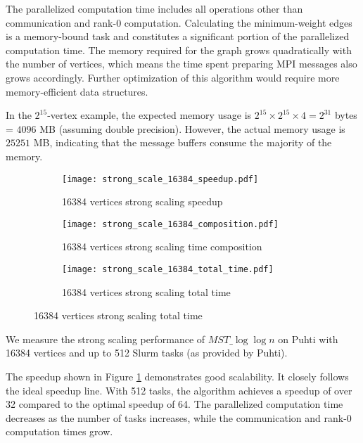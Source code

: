 \documentclass[english, 12pt, a4paper, elec, utf8, a-2b, online]{aaltothesis}
\newcommand{\mstalgo}{$MST\_\log\log{n}$}
\begin{document}
The parallelized computation time includes all operations other than communication and rank-0 computation. Calculating the minimum-weight edges is a memory-bound task and constitutes a significant portion of the parallelized computation time. The memory required for the graph grows quadratically with the number of vertices, which means the time spent preparing MPI messages also grows accordingly. Further optimization of this algorithm would require more memory-efficient data structures.

In the $2^{15}$-vertex example, the expected memory usage is $2^{15} \times 2^{15} \times 4 = 2^{31}$ bytes = $4096$ MB (assuming double precision). However, the actual memory usage is $25251$ MB, indicating that the message buffers consume the majority of the memory.

\begin{figure}[h]
	\begin{subfigure}[b]{0.45\textwidth}
		\centering
		\texttt{[image: strong\_scale\_16384\_speedup.pdf]}
		\caption{16384 vertices strong scaling speedup}
		\label{fig:mpi_composition_strong_scaling_16384_speedup}
	\end{subfigure}
	\begin{subfigure}[b]{0.45\textwidth}
		\centering
		\texttt{[image: strong\_scale\_16384\_composition.pdf]}
		\caption{16384 vertices strong scaling time composition}
		\label{fig:mpi_composition_strong_scaling_16384}
	\end{subfigure}
	\vspace{0mm} %
	\begin{subfigure}[b]{1\textwidth}
		\centering
		\texttt{[image: strong\_scale\_16384\_total\_time.pdf]}
		\caption{16384 vertices strong scaling total time}
		\label{fig:mpi_composition_strong_scaling_16384_total}
	\end{subfigure}
	\label{fig:mpi_composition_strong_scaling_16384_}
\end{figure}

We measure the strong scaling performance of \mstalgo{} on Puhti with 16384 vertices and up to 512 Slurm tasks (as provided by Puhti).

The speedup shown in Figure \cref{fig:mpi_composition_strong_scaling_16384_speedup} demonstrates good scalability. It closely follows the ideal speedup line. With 512 tasks, the algorithm achieves a speedup of over 32 compared to the optimal speedup of 64. The parallelized computation time decreases as the number of tasks increases, while the communication and rank-0 computation times grow.
\end{document}
